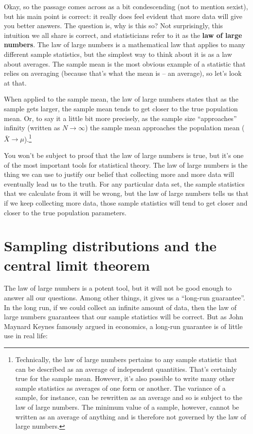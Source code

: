 \documentclass[
]{book}
\theoremstyle{definition}
\theoremstyle{definition}
\theoremstyle{definition}
\theoremstyle{definition}
\theoremstyle{remark}
\begin{document}
Okay, so the passage comes across as a bit condescending (not to mention sexist), but his main point is correct: it really does feel evident that more data will give you better answers. The question is, why is this so? Not surprisingly, this intuition we all share is correct, and statisticians refer to it as the \textbf{law of large numbers}. The law of large numbers is a mathematical law that applies to many different sample statistics, but the simplest way to think about it is as a law about averages. The sample mean is the most obvious example of a statistic that relies on averaging (because that's what the mean is -- an average), so let's look at that.

When applied to the sample mean, the law of large numbers states that as the sample gets larger, the sample mean tends to get closer to the true population mean. Or, to say it a little bit more precisely, as the sample size ``approaches'' infinity (written as \(N \rightarrow \infty\)) the sample mean approaches the population mean (\(\bar{X} \rightarrow \mu\)).\footnote{Technically, the law of large numbers pertains to any sample statistic that can be described as an average of independent quantities. That's certainly true for the sample mean. However, it's also possible to write many other sample statistics as averages of one form or another. The variance of a sample, for instance, can be rewritten as an average and so is subject to the law of large numbers. The minimum value of a sample, however, cannot be written as an average of anything and is therefore not governed by the law of large numbers.}

You won't be subject to proof that the law of large numbers is true, but it's one of the most important tools for statistical theory. The law of large numbers is the thing we can use to justify our belief that collecting more and more data will eventually lead us to the truth. For any particular data set, the sample statistics that we calculate from it will be wrong, but the law of large numbers tells us that if we keep collecting more data, those sample statistics will tend to get closer and closer to the true population parameters.

\hypertarget{samplesandclt}{%
\section{Sampling distributions and the central limit theorem}\label{samplesandclt}}

The law of large numbers is a potent tool, but it will not be good enough to answer all our questions. Among other things, it gives us a ``long-run guarantee''. In the long run, if we could collect an infinite amount of data, then the law of large numbers guarantees that our sample statistics will be correct. But as John Maynard Keynes famously argued in economics, a long-run guarantee is of little use in real life:
\end{document}
